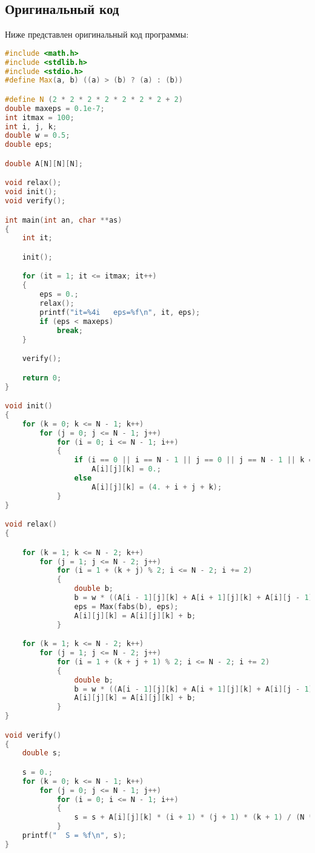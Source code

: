 \subsection{Оригинальный код}
Ниже представлен оригинальный код программы:
\begin{lstlisting}[language=c++]
#include <math.h>
#include <stdlib.h>
#include <stdio.h>
#define Max(a, b) ((a) > (b) ? (a) : (b))

#define N (2 * 2 * 2 * 2 * 2 * 2 * 2 + 2)
double maxeps = 0.1e-7;
int itmax = 100;
int i, j, k;
double w = 0.5;
double eps;

double A[N][N][N];

void relax();
void init();
void verify();

int main(int an, char **as)
{
	int it;

	init();

	for (it = 1; it <= itmax; it++)
	{
		eps = 0.;
		relax();
		printf("it=%4i   eps=%f\n", it, eps);
		if (eps < maxeps)
			break;
	}

	verify();

	return 0;
}

void init()
{
	for (k = 0; k <= N - 1; k++)
		for (j = 0; j <= N - 1; j++)
			for (i = 0; i <= N - 1; i++)
			{
				if (i == 0 || i == N - 1 || j == 0 || j == N - 1 || k == 0 || k == N - 1)
					A[i][j][k] = 0.;
				else
					A[i][j][k] = (4. + i + j + k);
			}
}

void relax()
{

	for (k = 1; k <= N - 2; k++)
		for (j = 1; j <= N - 2; j++)
			for (i = 1 + (k + j) % 2; i <= N - 2; i += 2)
			{
				double b;
				b = w * ((A[i - 1][j][k] + A[i + 1][j][k] + A[i][j - 1][k] + A[i][j + 1][k] + A[i][j][k - 1] + A[i][j][k + 1]) / 6. - A[i][j][k]);
				eps = Max(fabs(b), eps);
				A[i][j][k] = A[i][j][k] + b;
			}

	for (k = 1; k <= N - 2; k++)
		for (j = 1; j <= N - 2; j++)
			for (i = 1 + (k + j + 1) % 2; i <= N - 2; i += 2)
			{
				double b;
				b = w * ((A[i - 1][j][k] + A[i + 1][j][k] + A[i][j - 1][k] + A[i][j + 1][k] + A[i][j][k - 1] + A[i][j][k + 1]) / 6. - A[i][j][k]);
				A[i][j][k] = A[i][j][k] + b;
			}
}

void verify()
{
	double s;

	s = 0.;
	for (k = 0; k <= N - 1; k++)
		for (j = 0; j <= N - 1; j++)
			for (i = 0; i <= N - 1; i++)
			{
				s = s + A[i][j][k] * (i + 1) * (j + 1) * (k + 1) / (N * N * N);
			}
	printf("  S = %f\n", s);
}

\end{lstlisting}

